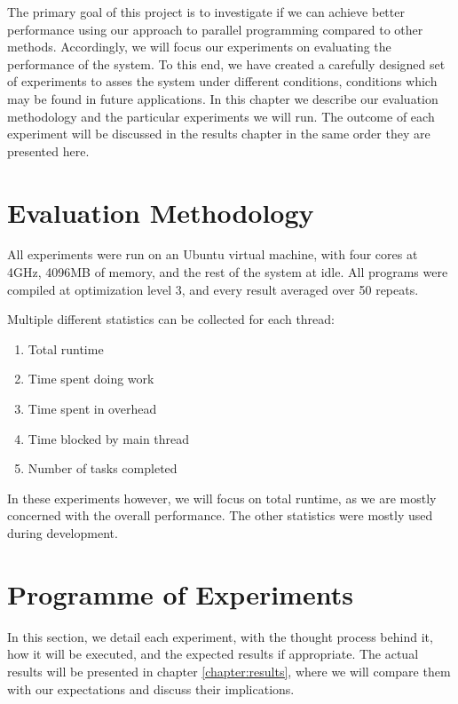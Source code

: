 
\newif\iflabela
\newif\iflabelb
\newif\iflabelc
\newif\iflabeld
\newif\iflabele



The primary goal of this project is to investigate if we can achieve better performance using our approach to parallel programming compared to other methods. Accordingly, we will focus our experiments on evaluating the performance of the system. To this end, we have created a carefully designed set of experiments to asses the system under different conditions, conditions which may be found in future applications. In this chapter we describe our evaluation methodology and the particular experiments we will run. The outcome of each experiment will be discussed in the results chapter in the same order they are presented here.



\section{Evaluation Methodology}

All experiments were run on an Ubuntu virtual machine, with four cores at 4GHz, 4096MB of memory, and the rest of the system at idle. All programs were compiled at optimization level 3, and every result averaged over 50 repeats.

Multiple different statistics can be collected for each thread:

\begin{enumerate}
	\item Total runtime
	\item Time spent doing work
	\item Time spent in overhead
	\item Time blocked by main thread
	\item Number of tasks completed
\end{enumerate}

In these experiments however, we will focus on total runtime, as we are mostly concerned with the overall performance. The other statistics were mostly used during development.



\section{Programme of Experiments}

In this section, we detail each experiment, with the thought process behind it, how it will be executed, and the expected results if appropriate. The actual results will be presented in chapter \ref{chapter:results}, where we will compare them with our expectations and discuss their implications.

